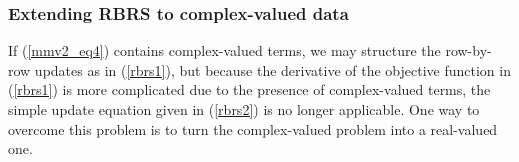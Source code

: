 \documentclass[final]{siamltex}
\newenvironment{adamItemize}{\begin{list}{$\bullet$}
{\setlength{\rightmargin}{0em}
\setlength{\leftmargin}{2.0em}
\setlength{\itemsep}{6pt}
\setlength{\topsep}{2pt}
\setlength{\parsep}{0pt}}}{\end{list}}
\newcommand{\la}[1]{\mbox{$\mathbf{#1}$}}  \newcommand{\sst}[1]{\mbox{\scriptsize{#1}}}
\begin{document}


   \subsubsection{Extending RBRS to complex-valued data} If
   (\ref{mmv2_eq4}) contains complex-valued terms, we may structure
   the row-by-row updates as in (\ref{rbrs1}), but because the
   derivative of the objective function in (\ref{rbrs1}) is more
   complicated due to the presence of complex-valued terms, the simple
   update equation given in (\ref{rbrs2}) is no longer applicable.
   One way to overcome this problem is to turn the complex-valued
   problem into a real-valued one.
\end{document}
